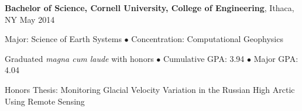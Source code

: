 
\textbf{Bachelor of Science, Cornell University, College of Engineering}, Ithaca, NY \hfill May 2014

Major: Science of Earth Systems $\bullet$ Concentration: Computational Geophysics

Graduated \textit{magna cum laude} with honors $\bullet$ Cumulative GPA: 3.94 $\bullet$ Major GPA: 4.04

Honors Thesis: Monitoring Glacial Velocity Variation in the Russian High Arctic Using Remote Sensing
